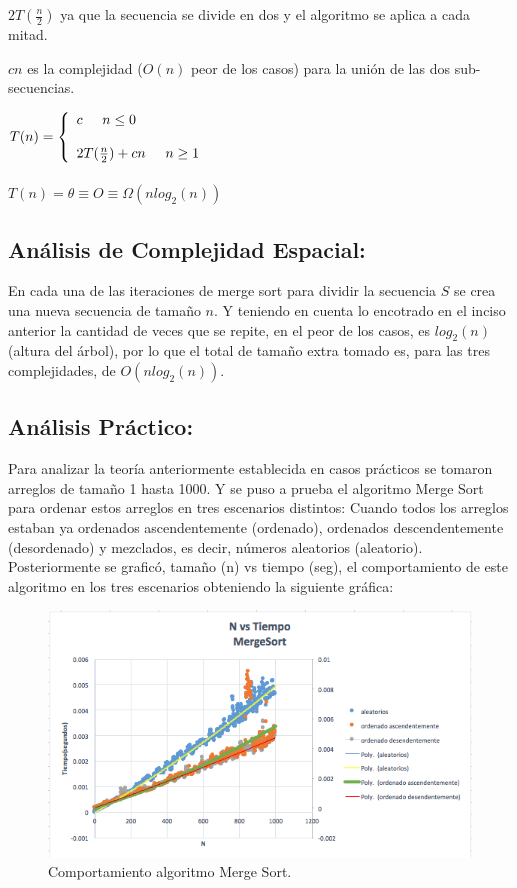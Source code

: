 \documentclass[12pt,spanish]{article}
\theoremstyle{definition}
\begin{document}
$2T(\frac{n}{2})$ ya que la secuencia se divide en dos y el algoritmo se aplica a cada mitad.

$cn$ es la complejidad ($O(n)$ peor de los casos) para la unión de las dos sub-secuencias. 

$T(n)= \left\{ \begin{array}{lcc}
              c \hspace{0.5cm}  n \leq 0 \\
              \\ 2T(\frac{n}{2}) +cn \hspace{0.5cm} n \geq 1 \\
              \end{array}
    \right.$ \\ \\
$T(n) = \theta \equiv O \equiv \Omega(nlog_{2}(n))$
\subsection{ Análisis de Complejidad Espacial:}
En cada una de las iteraciones de merge sort para dividir la secuencia $S$ se crea una nueva secuencia  de tamaño $n$. Y teniendo en cuenta lo encotrado en el inciso anterior la cantidad de veces que se repite, en el peor de los casos, es $log_{2}(n)$ (altura del árbol), por lo que el total de tamaño extra tomado es, para las tres complejidades, de $O(nlog_{2}(n))$.
\subsection{ Análisis Práctico:}
Para analizar la teoría anteriormente establecida en casos prácticos se tomaron arreglos de tamaño 1 hasta 1000. Y se puso a prueba el algoritmo Merge Sort para ordenar estos arreglos en tres escenarios distintos: Cuando todos los arreglos estaban ya ordenados ascendentemente (ordenado), ordenados descendentemente (desordenado) y mezclados, es decir, números aleatorios (aleatorio). Posteriormente se graficó, tamaño (n) vs tiempo (seg), el comportamiento de este algoritmo en los tres escenarios obteniendo la siguiente gráfica:

\begin{figure}[htb]
\centering
\includegraphics[scale=0.6]{M}
\caption{Comportamiento algoritmo Merge Sort.}
\end{figure}
\end{document}
